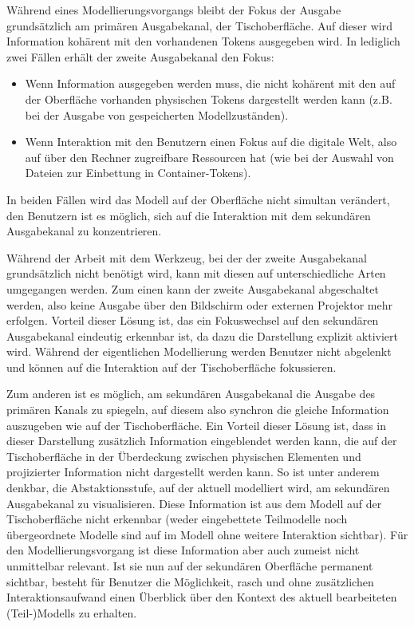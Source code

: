 Während eines Modellierungsvorgangs bleibt der Fokus der Ausgabe grundsätzlich am primären Ausgabekanal, der Tischoberfläche. Auf dieser wird Information kohärent mit den vorhandenen Tokens ausgegeben wird. In lediglich zwei Fällen erhält der zweite Ausgabekanal den Fokus:
\begin{itemize}
 \item Wenn Information ausgegeben werden muss, die nicht kohärent mit den auf der Oberfläche vorhanden physischen Tokens dargestellt werden kann (z.B. bei der Ausgabe von gespeicherten Modellzuständen).
 \item Wenn Interaktion mit den Benutzern einen Fokus auf die digitale Welt, also auf über den Rechner zugreifbare Ressourcen hat (wie bei der Auswahl von Dateien zur Einbettung in Container-Tokens).
\end{itemize}
In beiden Fällen wird das Modell auf der Oberfläche nicht simultan verändert, den Benutzern ist es möglich, sich auf die Interaktion mit dem sekundären Ausgabekanal zu konzentrieren.

Während der Arbeit mit dem Werkzeug, bei der der zweite Ausgabekanal grundsätzlich nicht benötigt wird, kann mit diesen auf unterschiedliche Arten umgegangen werden. Zum einen kann der zweite Ausgabekanal abgeschaltet werden, also keine Ausgabe über den Bildschirm oder externen Projektor mehr erfolgen. Vorteil dieser Lösung ist, das ein Fokuswechsel auf den sekundären Ausgabekanal eindeutig erkennbar ist, da dazu die Darstellung explizit aktiviert wird. Während der eigentlichen Modellierung werden Benutzer nicht abgelenkt und können auf die Interaktion auf der Tischoberfläche fokussieren.

Zum anderen ist es möglich, am sekundären Ausgabekanal die Ausgabe des primären Kanals zu spiegeln, auf diesem also synchron die gleiche Information auszugeben wie auf der Tischoberfläche. Ein Vorteil dieser Lösung ist, dass in dieser Darstellung zusätzlich Information eingeblendet werden kann, die auf der Tischoberfläche in der Überdeckung zwischen physischen Elementen und projizierter Information nicht dargestellt werden kann. So ist unter anderem denkbar, die Abstaktionsstufe, auf der aktuell modelliert wird, am sekundären Ausgabekanal zu visualisieren. Diese Information ist aus dem Modell auf der Tischoberfläche nicht erkennbar (weder eingebettete Teilmodelle noch übergeordnete Modelle sind auf im Modell ohne weitere Interaktion sichtbar). Für den Modellierungsvorgang ist diese Information aber auch zumeist nicht unmittelbar relevant. Ist sie nun auf der sekundären Oberfläche permanent sichtbar, besteht für Benutzer die Möglichkeit, rasch und ohne zusätzlichen Interaktionsaufwand einen Überblick über den Kontext des aktuell bearbeiteten (Teil-)Modells zu erhalten.

